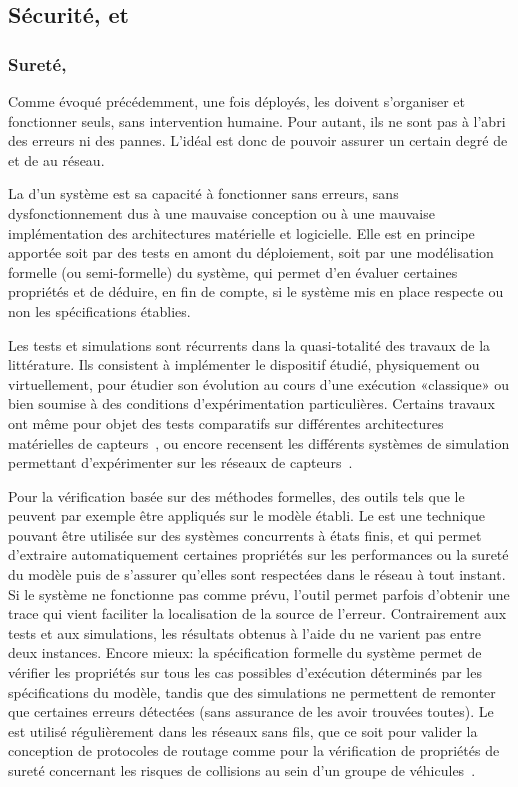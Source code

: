     \subsection{Sécurité,  et \resilience}
        \subsubsection{Sureté, \resilience}
Comme évoqué précédemment, une fois déployés, les \rcs doivent s'organiser et fonctionner seuls, sans intervention humaine.
Pour autant, ils ne sont pas à l'abri des erreurs ni des pannes.
L'idéal est donc de pouvoir assurer un certain degré de  et de \resilience au réseau.

La  d'un système est sa capacité à fonctionner sans erreurs, \cad sans dysfonctionnement dus à une mauvaise conception ou à une mauvaise implémentation des architectures matérielle et logicielle.
Elle est en principe apportée soit par des tests en amont du déploiement, soit par une modélisation formelle (ou semi-formelle) du système, qui permet d'en évaluer certaines propriétés et de déduire, en fin de compte, si le système mis en place respecte ou non les spécifications établies.

Les tests et simulations sont récurrents dans la quasi-totalité des travaux de la littérature.
Ils consistent à implémenter le dispositif étudié, physiquement ou virtuellement, pour étudier son évolution au cours d'une exécution «classique» ou bien soumise à des conditions d'expérimentation particulières.
Certains travaux ont même pour objet des tests comparatifs sur différentes architectures matérielles de capteurs~\cite{PLP06}, ou encore recensent les différents systèmes de simulation permettant d'expérimenter sur les réseaux de capteurs~\cite{AAAHN12}.

Pour la vérification basée sur des méthodes formelles, des outils tels que le  peuvent par exemple être appliqués sur le modèle établi.
Le  est une technique pouvant être utilisée sur des systèmes concurrents à états finis, et qui permet d'extraire automatiquement certaines propriétés sur les performances ou la sureté du modèle puis de s'assurer qu'elles sont respectées dans le réseau à tout instant.
Si le système ne fonctionne pas comme prévu, l'outil permet parfois d'obtenir une trace qui vient faciliter la localisation de la source de l'erreur.
Contrairement aux tests et aux simulations, les résultats obtenus à l'aide du  ne varient pas entre deux instances.
Encore mieux: la spécification formelle du système permet de vérifier les propriétés sur tous les cas possibles d'exécution déterminés par les spécifications du modèle, tandis que des simulations ne permettent de remonter que certaines erreurs détectées (sans assurance de les avoir trouvées toutes).
Le  est utilisé régulièrement dans les réseaux sans fils, que ce soit pour valider la conception de protocoles de routage comme pour la vérification de propriétés de sureté concernant les risques de collisions au sein d'un groupe de véhicules~\cite{E-ZCGGK12}.

